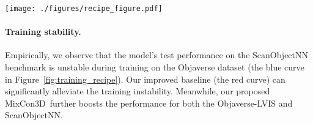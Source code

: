 \documentclass{article} \usepackage{iclr2024_conference,times}
\makeatletter
\newcommand{\ourmethod}{MixCon3D}
\newcommand{\red}[1]{\textcolor[rgb]{0.9,0.0,0.0}{\@#1}}
\newcommand{\blue}[1]{\textcolor[rgb]{0.0,0.0,0.9}{\@#1}}
\makeatother
\begin{document}
\begin{table*}[t]
\centering
  \renewcommand\tabcolsep{4pt}
  \caption{The analysis of settings of temperature for the constrastive losses.}
  \label{tab:ema_decay_abl}
\end{table*} \begin{figure*}[t]
  \centering
  \texttt{[image: ./figures/recipe\_figure.pdf]}
   \caption{The zero-shot Top1 accuracy curve comparisons between the \blue{baseline},
   the improved \textcolor{red}{strong baseline} and our \textcolor{violet}{\ourmethod}.
   Our improved baseline can not only perform better on the Objaverse-LVIS benchmark 
   (the left sub-figure) but also stabilize the 
   generalization performance 
   (the right sub-figure).
   }
   \label{fig:training_recipe}
\end{figure*}


\paragraph{Training stability.}
Empirically, we observe that the model's test performance on the ScanObjectNN benchmark is unstable during training on the Objaverse dataset (the \blue{blue} curve in Figure~\ref{fig:training_recipe}).
Our improved baseline (the \red{red} curve) can significantly alleviate the training instability.
Meanwhile, our proposed \ourmethod~further boosts the performance for both the Objaverse-LVIS and ScanObjectNN.
\end{document}
